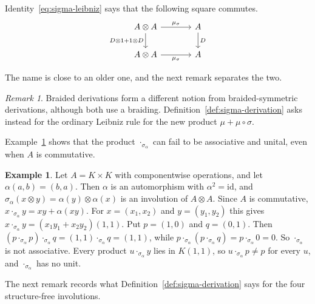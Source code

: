 \documentclass[]{interact}
\theoremstyle{plain}
\theoremstyle{definition}
\newtheorem{example}[theorem]{Example}
\theoremstyle{remark}
\newtheorem{remark}[theorem]{Remark}
\begin{document}
Identity~\eqref{eq:sigma-leibniz} says that the following square commutes.
\[
\begin{tikzcd}[column sep=large]
A \otimes A \arrow[r, "\mu_\sigma"] \arrow[d, "D \otimes 1 + 1 \otimes D"'] & A \arrow[d, "D"] \\
A \otimes A \arrow[r, "\mu_\sigma"'] & A
\end{tikzcd}
\]

The name is close to an older one, and the next remark separates the two.

\begin{remark}\label{rem:distinction-from-braided}
Braided derivations \citep[\S2]{Rozanski1996} \citep[\S4.1, Definition 14]{Huru2006} form a different notion from braided-symmetric derivations, although both use a braiding.
Definition~\ref{def:sigma-derivation} asks instead for the ordinary Leibniz rule for the new product $\mu + \mu \circ \sigma$.

\end{remark}

Example~\ref{ex:not-associative} shows that the product $\cdot_{\sigma_\alpha}$ can fail to be associative and unital, even when $A$ is commutative.

\begin{example}\label{ex:not-associative}
Let $A = K \times K$ with componentwise operations, and let $\alpha(a,b) = (b,a)$.
Then $\alpha$ is an automorphism with $\alpha^2 = \mathrm{id}$, and $\sigma_\alpha(x \otimes y) = \alpha(y) \otimes \alpha(x)$ is an involution of $A \otimes A$.
Since $A$ is commutative, $x \cdot_{\sigma_\alpha} y = xy + \alpha(xy)$.
For $x = (x_1, x_2)$ and $y = (y_1, y_2)$ this gives $x \cdot_{\sigma_\alpha} y = (x_1y_1 + x_2y_2)(1,1)$.
Put $p = (1,0)$ and $q = (0,1)$.
Then $(p \cdot_{\sigma_\alpha} p) \cdot_{\sigma_\alpha} q = (1,1) \cdot_{\sigma_\alpha} q = (1,1)$, while $p \cdot_{\sigma_\alpha} (p \cdot_{\sigma_\alpha} q) = p \cdot_{\sigma_\alpha} 0 = 0$.
So $\cdot_{\sigma_\alpha}$ is not associative.
Every product $u \cdot_{\sigma_\alpha} y$ lies in $K(1,1)$, so $u \cdot_{\sigma_\alpha} p \neq p$ for every $u$, and $\cdot_{\sigma_\alpha}$ has no unit.
\end{example}

The next remark records what Definition~\ref{def:sigma-derivation} says for the four structure-free involutions.
\end{document}
